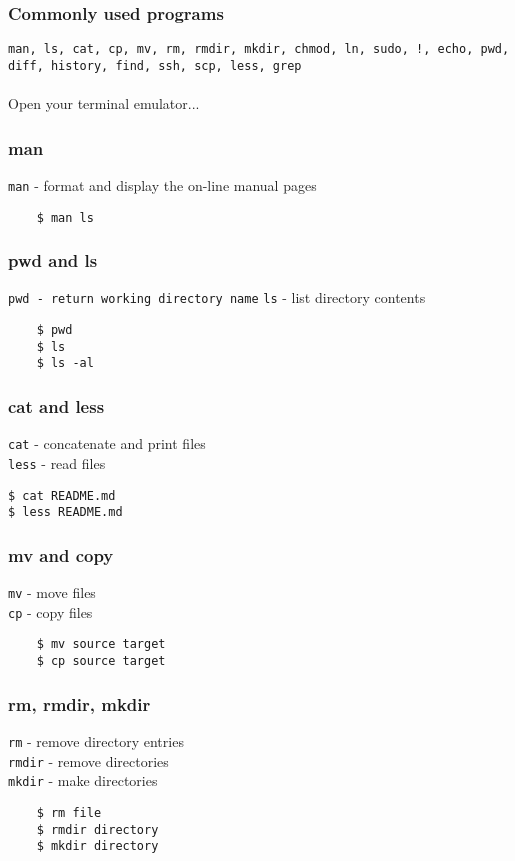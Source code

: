 \documentclass{beamer}
\begin{document}
\begin{frame}
\frametitle{Commonly used programs}
\texttt{man, ls, cat, cp, mv, rm, rmdir, mkdir, chmod, ln, sudo, !, echo, pwd, diff, history, find, ssh, scp, less, grep}
\\~\\
Open your terminal emulator...
\end{frame}


\begin{frame}[fragile]
\frametitle{man}
	\texttt{man} - format and display the on-line manual pages
	\begin{verbatim}
	$ man ls
	\end{verbatim}
\end{frame}


\begin{frame}[fragile]
\frametitle{pwd and ls}
	\texttt{pwd - return working directory name}
	\texttt{ls} - list directory contents	
	\begin{verbatim}
	$ pwd
	$ ls
	$ ls -al
	\end{verbatim}
\end{frame}


\begin{frame}[fragile]
\frametitle{cat and less}
	\texttt{cat} - concatenate and print files
	\\
	\texttt{less} - read files
	\begin{verbatim}
$ cat README.md
$ less README.md
	\end{verbatim}
\end{frame}


\begin{frame}[fragile]
\frametitle{mv and copy}
	\texttt{mv} - move files
	\\
	\texttt{cp} - copy files
	\begin{verbatim}
	$ mv source target
	$ cp source target
	\end{verbatim}
\end{frame}


\begin{frame}[fragile]
\frametitle{rm, rmdir, mkdir}
	\texttt{rm} - remove directory entries
	\\
	\texttt{rmdir} - remove directories
	\\
	\texttt{mkdir} - make directories
	\begin{verbatim}
	$ rm file
	$ rmdir directory
	$ mkdir directory
	\end{verbatim}
\end{frame}
\end{document}
